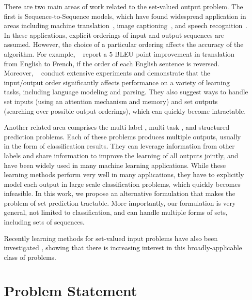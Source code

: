 \documentclass[letterpaper]{article}
\newcommand{\citet}[1]{\citeauthor{#1}~\shortcite{#1}}
\begin{document}
There are two main areas of work related to the set-valued output problem. The first is Sequence-to-Sequence models,  which have found widespread application in areas including machine translation~\cite{DBLP:journals/corr/BahdanauCB14:NMT,DBLP:journals/corr/ChoMGBSB14}, image captioning~\cite{DBLP:journals/corr/VinyalsTBE14}, and speech recognition~\cite{hintonspeech}. In these applications,  explicit orderings of input and output sequences are assumed. However, the choice of a particular ordering affects the accuracy of the algorithm. For example, \citet{DBLP:journals/corr/SutskeverVL14} report a 5 BLEU point improvement in translation from English  to French, if the order of each English sentence is reversed. Moreover, \citet{order_matters} conduct extensive experiments and demonstrate that the input/output order significantly affects performance on a variety of learning tasks, including language modeling and parsing. They also suggest ways to handle set inputs (using an attention mechanism and memory) and set outputs (searching over possible output orderings), which can quickly become intractable.

Another related area comprises the multi-label \cite{tsoumakas2009mining,zhang2014review}, multi-task \cite{xue2007multi,argyriou2007multi,argyriou2008convex}, and structured prediction \cite{taskar2005learning} problems. Each of these problems produces multiple outputs, usually in the form of classification results. They can leverage information from other labels and share information to improve the learning of all outputs jointly, and have been widely used in many machine learning applications. While these learning methods perform very well in many applications, they have to explicitly model each output in large scale classification problems, which quickly becomes infeasible. In this work, we propose an alternative formulation that makes the problem of set prediction tractable. More importantly, our formulation is very general, not limited to classification, and can handle multiple forms of sets, including sets of sequences.

Recently learning methods for set-valued input problems have also been investigated \cite{zaheer2017deep}, showing that there is increasing interest in this broadly-applicable class of problems.


\section{Problem Statement}
\end{document}

